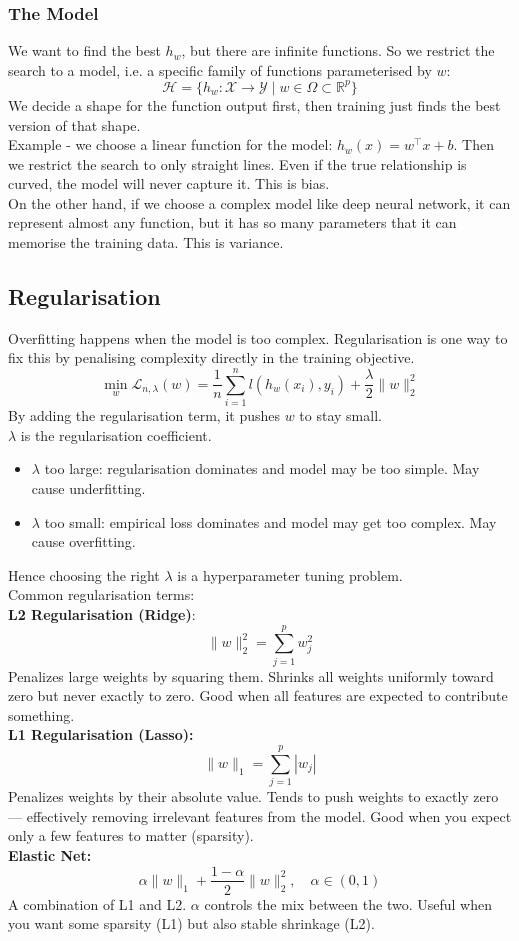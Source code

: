 \documentclass[../Probability.tex]{subfiles}
\begin{document}
\subsubsection{The Model}
We want to find the best $h_w$, but there are infinite functions.
So we restrict the search to a model, i.e. a specific family of functions parameterised by $w$:
$$\mathcal{H} = \{h_w : \mathcal{X} \to \mathcal{Y} \mid w \in \Omega \subset \mathbb{R}^p\}$$
We decide a shape for the function output first, then training just finds the best version of that shape.\\
Example - we choose a linear function for the model: $h_w(x) = w^\top x + b$.
Then we restrict the search to only straight lines. Even if the true relationship is curved, the model will never capture it. This is bias.\\
On the other hand, if we choose a complex model like deep neural network, it can represent almost any function, but it has so many parameters that it can memorise the training data. This is variance.

\subsection{Regularisation}
Overfitting happens when the model is too complex. Regularisation is one way to fix this by penalising complexity directly in the training objective.\\
$$\min_w \mathcal{L}_{n,\lambda}(w) = \frac{1}{n} \sum_{i=1}^{n} l(h_w(x_i), y_i) + \frac{\lambda}{2} \|w\|_2^2$$
By adding the regularisation term, it pushes $w$ to stay small.\\
$\lambda$ is the regularisation coefficient.
\begin{itemize}
    \item $\lambda$ too large: regularisation dominates and model may be too simple. May cause underfitting.
    \item $\lambda$ too small: empirical loss dominates and model may get too complex. May cause overfitting.
\end{itemize}
Hence choosing the right $\lambda$ is a hyperparameter tuning problem.\\
Common regularisation terms:\\
\textbf{L2 Regularisation (Ridge)}:
$$\|w\|_2^2 = \sum_{j=1}^{p} w_j^2$$
Penalizes large weights by squaring them. Shrinks all weights uniformly toward zero but never exactly to zero. Good when all features are expected to contribute something.\\
\textbf{L1 Regularisation (Lasso):}
$$\|w\|_1 = \sum_{j=1}^{p} |w_j|$$
Penalizes weights by their absolute value. Tends to push weights to exactly zero — effectively removing irrelevant features from the model. Good when you expect only a few features to matter (sparsity).\\
\textbf{Elastic Net:}
$$\alpha \|w\|_1 + \frac{1-\alpha}{2} \|w\|_2^2, \quad \alpha \in (0,1)$$
A combination of L1 and L2. $\alpha$ controls the mix between the two. Useful when you want some sparsity (L1) but also stable shrinkage (L2).
\end{document}

